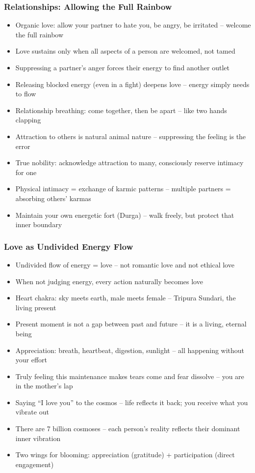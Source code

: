 \begin{frame}[fragile]\frametitle{Relationships: Allowing the Full Rainbow}
  \begin{itemize}
    \item Organic love: allow your partner to hate you, be angry, be irritated -- welcome the full rainbow
    \item Love sustains only when all aspects of a person are welcomed, not tamed
    \item Suppressing a partner's anger forces their energy to find another outlet
    \item Releasing blocked energy (even in a fight) deepens love -- energy simply needs to flow
    \item Relationship breathing: come together, then be apart -- like two hands clapping
    \item Attraction to others is natural animal nature -- suppressing the feeling is the error
    \item True nobility: acknowledge attraction to many, consciously reserve intimacy for one
    \item Physical intimacy = exchange of karmic patterns -- multiple partners = absorbing others' karmas
    \item Maintain your own energetic fort (Durga) -- walk freely, but protect that inner boundary
  \end{itemize}
\end{frame}

\begin{frame}[fragile]\frametitle{Love as Undivided Energy Flow}
  \begin{itemize}
    \item Undivided flow of energy = love -- not romantic love and not ethical love
    \item When not judging energy, every action naturally becomes love
    \item Heart chakra: sky meets earth, male meets female -- Tripura Sundari, the living present
    \item Present moment is not a gap between past and future -- it is a living, eternal being
    \item Appreciation: breath, heartbeat, digestion, sunlight -- all happening without your effort
    \item Truly feeling this maintenance makes tears come and fear dissolve -- you are in the mother's lap
    \item Saying ``I love you'' to the cosmos -- life reflects it back; you receive what you vibrate out
    \item There are 7 billion cosmoses -- each person's reality reflects their dominant inner vibration
    \item Two wings for blooming: appreciation (gratitude) + participation (direct engagement)
  \end{itemize}
\end{frame}

